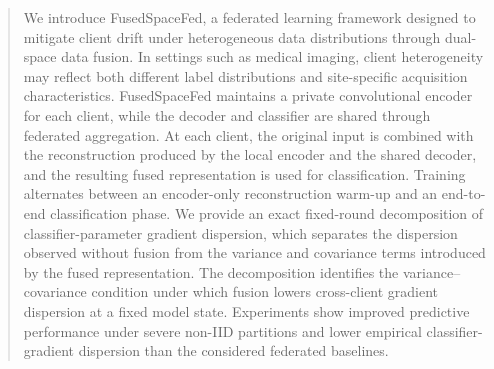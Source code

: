 \documentclass[twoside]{article}
\theoremstyle{thmstyleone}%
\theoremstyle{thmstyletwo}%
\theoremstyle{thmstylethree}%
\begin{document}
%

%


\begin{abstract}
  We introduce FusedSpaceFed, a federated learning framework designed to mitigate client drift under heterogeneous data distributions through dual-space data fusion. In settings such as medical imaging, client heterogeneity may reflect both different label distributions and site-specific acquisition characteristics. FusedSpaceFed maintains a private convolutional encoder for each client, while the decoder and classifier are shared through federated aggregation. At each client, the original input is combined with the reconstruction produced by the local encoder and the shared decoder, and the resulting fused representation is used for classification. Training alternates between an encoder-only reconstruction warm-up and an end-to-end classification phase. We provide an exact fixed-round decomposition of classifier-parameter gradient dispersion, which separates the dispersion observed without fusion from the variance and covariance terms introduced by the fused representation. The decomposition identifies the variance--covariance condition under which fusion lowers cross-client gradient dispersion at a fixed model state. Experiments show improved predictive performance under severe non-IID partitions and lower empirical classifier-gradient dispersion than the considered federated baselines.
\end{abstract}
\end{document}
